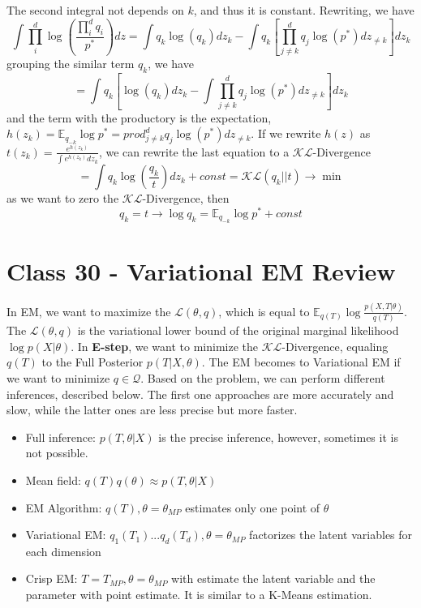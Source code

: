 \documentclass{article}
\begin{document}
The second integral not depends on $k$, and thus it is constant. Rewriting, we have
\begin{equation}
    \int\prod_i^d \log\left(\frac{\prod_i^d q_i}{p^*} \right)dz = \int q_k\log(q_k) dz_k - \int q_k \left[\prod_{j\neq k}^d q_j \log(p^*) dz_{\neq k}\right]dz_k
\end{equation}
grouping the similar term $q_k$, we have
\begin{equation}
    = \int q_k \left[\log(q_k) dz_k - \int \prod_{j\neq k}^d q_j \log(p^*) dz_{\neq k}\right] dz_k
\end{equation}
and the term with the productory is the expectation, $h(z_k) = \mathbb{E}_{q_{-k}}\log p^* = prod_{j\neq k}^d q_j \log(p^*) dz_{\neq k}$. If we rewrite $h(z)$ as $t(z_k) = \frac{e^{h(z_k)}}{\int e^{h(z_k)}dz_k}$, we can rewrite the last equation to a $\mathcal{KL}$-Divergence
\begin{equation}
    = \int q_k \log\left(\frac{q_k}{t}\right)dz_k + const = \mathcal{KL}(q_k||t) \rightarrow \min
\end{equation}
as we want to zero the $\mathcal{KL}$-Divergence, then
\begin{equation}
    q_k = t \rightarrow \log q_k = \mathbb{E}_{q_{-k}} \log p^* + const
\end{equation}

\section{Class 30 - Variational EM Review}
In EM, we want to maximize the $\mathcal{L}(\theta, q)$, which is equal to $\mathbb{E}_{q(T)}\log\frac{p(X, T|\theta)}{q(T)}$. The $\mathcal{L}(\theta, q)$ is the variational lower bound of the original marginal likelihood $\log p(X|\theta)$. In \textbf{E-step}, we want to minimize the $\mathcal{KL}$-Divergence, equaling $q(T)$ to the Full Posterior $p(T|X, \theta)$. The EM becomes to Variational EM if we want to minimize $q\in\mathcal{Q}$. Based on the problem, we can perform different inferences, described below. The first one approaches are more accurately and slow, while the latter ones are less precise but more faster.
\begin{itemize}
    \item Full inference: $p(T, \theta|X)$ is the precise inference, however, sometimes it is not possible.
    \item Mean field: $q(T)q(\theta)\approx p(T, \theta|X)$
    \item EM Algorithm: $q(T), \theta = \theta_{MP}$ estimates only one point of $\theta$
    \item Variational EM: $q_1(T_1)...q_d(T_d), \theta = \theta_{MP}$ factorizes the latent variables for each dimension
    \item Crisp EM: $T = T_{MP}, \theta = \theta_{MP}$ with estimate the latent variable and the parameter with point estimate. It is similar to a K-Means estimation.
\end{itemize}
\end{document}
